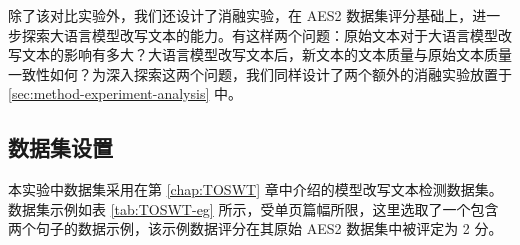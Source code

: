 除了该对比实验外，我们还设计了消融实验，在 AES2 数据集评分基础上，进一步探索大语言模型改写文本的能力。有这样两个问题：原始文本对于大语言模型改写文本的影响有多大？大语言模型改写文本后，新文本的文本质量与原始文本质量一致性如何？为深入探索这两个问题，我们同样设计了两个额外的消融实验放置于 \ref{sec:method-experiment-analysis} 中。

\subsection{数据集设置}
\label{sec:method-experiment-dataset}

本实验中数据集采用在第 \ref{chap:TOSWT} 章中介绍的模型改写文本检测数据集。数据集示例如表 \ref{tab:TOSWT-eg} 所示，受单页篇幅所限，这里选取了一个包含两个句子的数据示例，该示例数据评分在其原始 AES2 数据集中被评定为 2 分。

